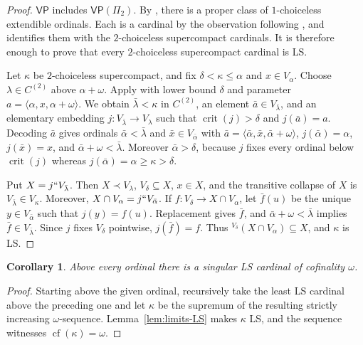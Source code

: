 \documentclass[11pt,a4paper]{amsart}
\newcommand{\VP}{\mathsf{VP}}
\newcommand{\crit}{\operatorname{crit}}
\newcommand{\cf}{\operatorname{cf}}
\theoremstyle{plain}
\newtheorem{corollary}[theorem]{Corollary}
\theoremstyle{definition}
\theoremstyle{remark}
\begin{document}
\begin{proof}
$\VP$ includes $\VP(\Pi_2)$.  By \cite[Theorem~3.1]{Mohammd}, there is a proper class of $1$-choiceless extendible ordinals.  Each is a cardinal by the observation following \cite[Definition~2.1]{Mohammd}, and \cite[Theorem~2.8]{Mohammd} identifies them with the $2$-choiceless supercompact cardinals.  It is therefore enough to prove that every $2$-choiceless supercompact cardinal is LS.

 Let $\kappa$ be $2$-choiceless supercompact, and fix $\delta<\kappa\leq\alpha$ and $x\in V_\alpha$.  Choose $\lambda\in C^{(2)}$ above $\alpha+\omega$.  Apply \cite[Definition~2.3]{Mohammd} with lower bound $\delta$ and parameter $a=\langle\alpha,x,\alpha+\omega\rangle$.  We obtain $\bar\lambda<\kappa$ in $C^{(2)}$, an element $\bar a\in V_{\bar\lambda}$, and an elementary embedding $j:V_{\bar\lambda}\longrightarrow V_\lambda$ such that $\crit(j)>\delta$ and $j(\bar a)=a$.  Decoding $\bar a$ gives ordinals $\bar\alpha<\bar\lambda$ and $\bar x\in V_{\bar\alpha}$ with $\bar a=\langle\bar\alpha,\bar x,\bar\alpha+\omega\rangle$, $j(\bar\alpha)=\alpha$, $j(\bar x)=x$, and $\bar\alpha+\omega<\bar\lambda$.  Moreover $\bar\alpha>\delta$, because $j$ fixes every ordinal below $\crit(j)$ whereas $j(\bar\alpha)=\alpha\geq\kappa>\delta$.

Put $X=j``V_{\bar\lambda}$.  Then $X\prec V_\lambda$, $V_\delta\subseteq X$, $x\in X$, and the transitive collapse of $X$ is $V_{\bar\lambda}\in V_\kappa$.  Moreover, $X\cap V_\alpha=j``V_{\bar\alpha}$.  If $f:V_\delta\to X\cap V_\alpha$, let $\bar f(u)$ be the unique $y\in V_{\bar\alpha}$ such that $j(y)=f(u)$.  Replacement gives $\bar f$, and $\bar\alpha+\omega<\bar\lambda$ implies $\bar f\in V_{\bar\lambda}$.  Since $j$ fixes $V_\delta$ pointwise, $j(\bar f)=f$.  Thus ${}^{V_\delta}(X\cap V_\alpha)\subseteq X$, and $\kappa$ is LS.
\end{proof}

\begin{corollary}\label{cor:singular-LS}
Above every ordinal there is a singular LS cardinal of cofinality $\omega$.
\end{corollary}

\begin{proof}
Starting above the given ordinal, recursively take the least LS cardinal above the preceding one and let $\kappa$ be the supremum of the resulting strictly increasing $\omega$-sequence.  Lemma~\ref{lem:limits-LS} makes $\kappa$ LS, and the sequence witnesses $\cf(\kappa)=\omega$.
\end{proof}
\end{document}
